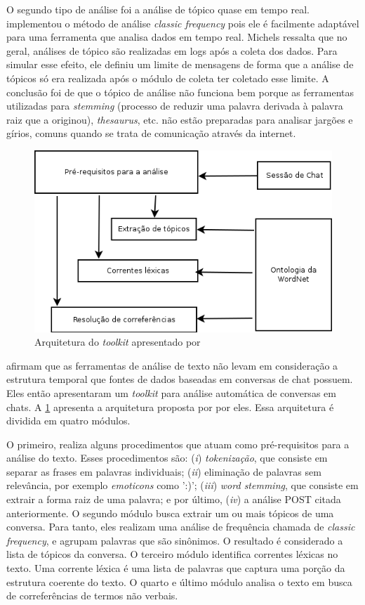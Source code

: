\documentclass[12pt]{article}
\begin{document}
O segundo tipo de análise foi a análise de tópico quase em tempo real.
 implementou o método de análise \textit{classic frequency}
\cite{gainaru2010} pois ele é facilmente adaptável para uma ferramenta que analisa
dados em tempo real.
%
Michels ressalta que no geral, análises de tópico são realizadas em logs
após a coleta dos dados. Para simular esse efeito, ele definiu um limite de
mensagens de forma que a análise de tópicos só era realizada após o módulo de
coleta ter coletado esse limite.
%
A conclusão foi de que o tópico de análise não funciona bem porque as
ferramentas utilizadas para \textit{stemming} (processo de reduzir uma
palavra derivada à palavra raiz que a originou), \textit{thesaurus}, etc.
não estão preparadas para analisar jargões e gírios, comuns quando se trata
de comunicação através da internet.

\begin{figure}[ht]
\centering
\includegraphics[width=.6\textwidth]{images/gainaru_architecture.png}
\caption{Arquitetura do \textit{toolkit} apresentado por \cite{gainaru2010}}
\label{fig:gainaru-architecture}
\end{figure}

 afirmam que as ferramentas
de análise de texto não levam em consideração a estrutura temporal que
fontes de dados baseadas em conversas de chat possuem. Eles então apresentaram
um \textit{toolkit} para análise automática de conversas em chats.
%
A \ref{fig:gainaru-architecture} apresenta a arquitetura proposta por por eles.
Essa arquitetura é dividida em quatro módulos.

O primeiro, realiza alguns procedimentos que atuam como pré-requisitos para
a análise do texto. Esses procedimentos são:
%
(\textit{i}) \textit{tokenização}, que consiste em separar as frases em
palavras individuais;
%
(\textit{ii}) eliminação de palavras sem relevância, por exemplo
\textit{emoticons} como ':)';
%
(\textit{iii}) \textit{word stemming}, que consiste em extrair a forma raiz
de uma palavra;
%
e por último, (\textit{iv}) a análise POST citada anteriormente.
%
O segundo módulo busca extrair um ou mais tópicos de uma conversa. Para
tanto, eles realizam uma análise de frequência chamada de \textit{classic
frequency}, e agrupam palavras que são sinônimos. 
%
O resultado é considerado a lista de tópicos da conversa.
%
O terceiro módulo identifica correntes léxicas no texto. Uma corrente
léxica é uma lista de palavras que captura uma porção da estrutura 
coerente  do texto.
%
O quarto e último módulo analisa o texto em busca de correferências de
termos não verbais.
\end{document}
